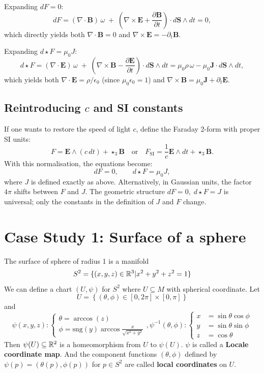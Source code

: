 \documentclass[12pt]{article}
\begin{document}
\noindent
Expanding \(dF=0\):
\[
dF = (\nabla\cdot\mathbf{B})\, \omega \;+\; \left(\nabla\times\mathbf{E} + \frac{\partial\mathbf{B}}{\partial t}\right)\cdot d\mathbf{S}\wedge dt = 0,
\]
which directly yields both \(\nabla\cdot\mathbf{B}=0\) and \(\nabla\times\mathbf{E} = -\partial_t\mathbf{B}\).

Expanding \(d\star F = \mu_0 J\):
\[
d\star F = (\nabla\cdot\mathbf{E})\, \omega \;+\; \left(\nabla\times\mathbf{B} - \frac{\partial\mathbf{E}}{\partial t}\right)\cdot d\mathbf{S}\wedge dt 
= \mu_0 \rho\, \omega - \mu_0 \mathbf{J}\cdot d\mathbf{S}\wedge dt,
\]
which yields both \(\nabla\cdot\mathbf{E} = \rho/\epsilon_0\) (since \(\mu_0\epsilon_0=1\)) and \(\nabla\times\mathbf{B} = \mu_0\mathbf{J} + \partial_t\mathbf{E}\).

\subsection*{Reintroducing \(c\) and SI constants}

If one wants to restore the speed of light \(c\), define the Faraday 2-form with proper SI units:
\[
F = \mathbf{E}\wedge (c\,dt) + \star_3\mathbf{B} \quad\text{or}\quad 
F_{\text{SI}} = \frac{1}{c}\mathbf{E}\wedge dt + \star_3\mathbf{B}.
\]
With this normalisation, the equations become:
\[
dF = 0, \qquad d\star F = \mu_0 J,
\]
where \(J\) is defined exactly as above. Alternatively, in Gaussian units, the factor \(4\pi\) shifts between \(F\) and \(J\). The geometric structure \(dF=0,\; d\star F = J\) is universal; only the constants in the definition of \(J\) and \(F\) change.

\newpage


\onecolumn
\section*{Case Study 1: Surface of a sphere}
The surface of sphere of radius 1 is a manifold $$S^2 = \{(x, y, z) \in \mathbb{R}^3 | x^2+y^2+z^2 = 1 \}$$
We can define a chart $(U, \psi)$ for $S^2$ where $U\subseteq M$ with spherical coordinate.  Let $$U = \left\{(\theta, \phi) \in [0, 2\pi]\times [0, \pi] \right\} $$
and $$
\psi(x,y,z): \begin{cases}
	\theta = \arccos(z) \\
	\phi = \text{sng}(y) \arccos \frac{x}{\sqrt{x^2 + y^2}}
\end{cases}, 
\psi^{-1}(\theta, \phi): 
\begin{cases}
	x &= \sin\theta \cos\phi \\
	y &= \sin\theta \sin\phi \\
	z &= \cos \theta
\end{cases} 
$$
Then $\psi(U) \subseteq \mathbb{R}^2$ is a homeomorphism from $U$ to $\psi(U)$. $\psi$ is called a \textbf{Locale coordinate map}. And the component functions $(\theta, \phi)$ defined by $\psi(p) = (\theta(p), \phi(p))$ for $p \in S^2$ are called \textbf{local coordinates} on $U$.
\end{document}
